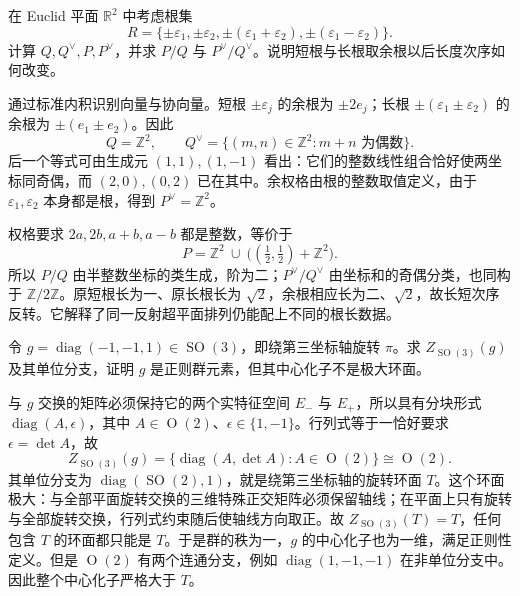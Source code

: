 \begin{exercise}\label{g1:ex:b2-coroots}
	在 Euclid 平面 \(\mathbb R^2\) 中考虑根集
	\[
		R=\{\pm\varepsilon_1,\pm\varepsilon_2,
		\pm(\varepsilon_1+\varepsilon_2),\pm(\varepsilon_1-\varepsilon_2)\}.
	\]
	计算 \(Q,Q^\vee,P,P^\vee\)，并求 \(P/Q\) 与 \(P^\vee/Q^\vee\)。说明短根与长根取余根以后长度次序如何改变。
\end{exercise}
\begin{solution}
	通过标准内积识别向量与协向量。短根 \(\pm\varepsilon_j\) 的余根为 \(\pm2e_j\)；长根 \(\pm(\varepsilon_1\pm\varepsilon_2)\) 的余根为 \(\pm(e_1\pm e_2)\)。因此
	\[
		Q=\mathbb Z^2,\qquad
		Q^\vee=\{(m,n)\in\mathbb Z^2:m+n\text{ 为偶数}\}.
	\]
	后一个等式可由生成元 \((1,1),(1,-1)\) 看出：它们的整数线性组合恰好使两坐标同奇偶，而 \((2,0),(0,2)\) 已在其中。余权格由根的整数取值定义，由于 \(\varepsilon_1,\varepsilon_2\) 本身都是根，得到 \(P^\vee=\mathbb Z^2\)。

	权格要求 \(2a,2b,a+b,a-b\) 都是整数，等价于
	\[
		P=\mathbb Z^2\ \cup\ \bigl((\tfrac12,\tfrac12)+\mathbb Z^2\bigr).
	\]
	所以 \(P/Q\) 由半整数坐标的类生成，阶为二；\(P^\vee/Q^\vee\) 由坐标和的奇偶分类，也同构于 \(\mathbb Z/2\mathbb Z\)。原短根长为一、原长根长为 \(\sqrt2\)，余根相应长为二、\(\sqrt2\)，故长短次序反转。它解释了同一反射超平面排列仍能配上不同的根长数据。
\end{solution}

\begin{exercise}\label{g1:ex:regular-so3-disconnected-centralizer}
	令 \(g=\operatorname{diag}(-1,-1,1)\in\operatorname{SO}(3)\)，即绕第三坐标轴旋转 \(\pi\)。求 \(Z_{\operatorname{SO}(3)}(g)\) 及其单位分支，证明 \(g\) 是正则群元素，但其中心化子不是极大环面。
\end{exercise}
\begin{solution}
	与 \(g\) 交换的矩阵必须保持它的两个实特征空间 \(E_-\) 与 \(E_+\)，所以具有分块形式 \(\operatorname{diag}(A,\epsilon)\)，其中 \(A\in\operatorname{O}(2)\)、\(\epsilon\in\{1,-1\}\)。行列式等于一恰好要求 \(\epsilon=\det A\)，故
	\[
		Z_{\operatorname{SO}(3)}(g)
		=\{\operatorname{diag}(A,\det A):A\in\operatorname{O}(2)\}
		\cong\operatorname{O}(2).
	\]
	其单位分支为 \(\operatorname{diag}(\operatorname{SO}(2),1)\)，就是绕第三坐标轴的旋转环面 \(T\)。这个环面极大：与全部平面旋转交换的三维特殊正交矩阵必须保留轴线；在平面上只有旋转与全部旋转交换，行列式约束随后使轴线方向取正。故 \(Z_{\operatorname{SO}(3)}(T)=T\)，任何包含 \(T\) 的环面都只能是 \(T\)。于是群的秩为一，\(g\) 的中心化子也为一维，满足正则性定义。但是 \(\operatorname{O}(2)\) 有两个连通分支，例如 \(\operatorname{diag}(1,-1,-1)\) 在非单位分支中。因此整个中心化子严格大于 \(T\)。
\end{solution}

